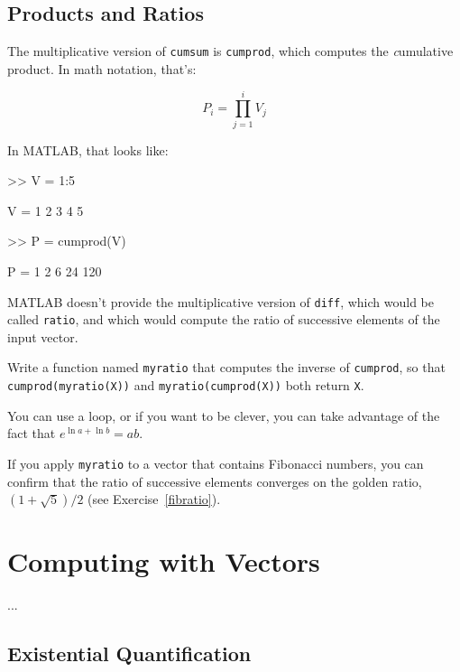 \subsection{Products and Ratios}

The multiplicative version of {\tt cumsum} is {\tt cumprod},
which computes the {\emph cumulative product}.  In math notation,
that's:


\begin{equation}
P_i = \prod_{j=1}^i V_j
\end{equation}

In MATLAB, that looks like:

\begin{code}
>> V = 1:5

V = 1     2     3     4     5

>> P = cumprod(V)

P = 1     2     6    24   120
\end{code}

MATLAB doesn't provide the multiplicative version
of {\tt diff}, which would be called {\tt ratio}, and which would
compute the ratio of successive elements of the input vector.

\begin{ex}
Write a function named {\tt myratio} that computes the
inverse of {\tt cumprod}, so that {\tt cumprod(myratio(X))} and
{\tt myratio(cumprod(X))} both
return {\tt X}.

You can use a loop, or if you want to be clever, you can take
advantage of the fact that $e^{\ln a + \ln b} = a b$.

If you apply {\tt myratio} to a vector that contains Fibonacci
numbers, you can confirm that the ratio of successive elements
converges on the golden ratio, $(1+\sqrt{5})/2$ (see
Exercise~\ref{fibratio}).

\end{ex}

\section{Computing with Vectors}
...
\subsection{Existential Quantification}


